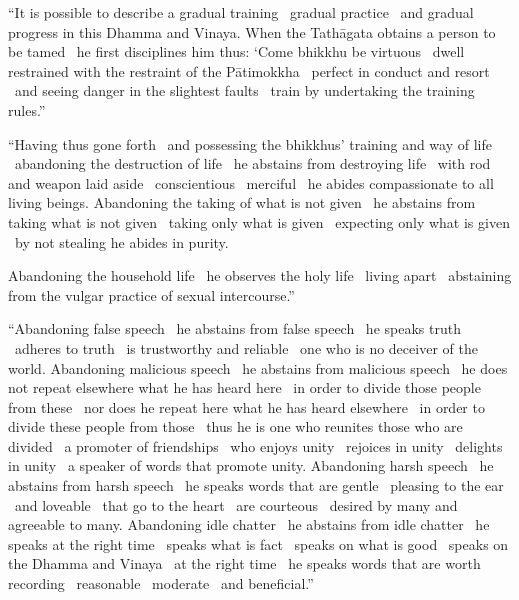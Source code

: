 “It is possible to describe a gradual training \breathmark\ gradual practice \breathmark\ and gradual progress in this Dhamma and Vinaya. When the Tathāgata obtains a person to be tamed \breathmark\ he first disciplines him thus: ‘Come bhikkhu be virtuous \breathmark\ dwell restrained with the restraint of the Pātimokkha \breathmark\ perfect in conduct and resort \breathmark\ and seeing danger in the slightest faults \breathmark\ train by undertaking the training rules.”

\suttaRef{[MN 107]}

“Having thus gone forth \breathmark\ and possessing the bhikkhus’ training and way of life \breathmark\ abandoning the destruction of life \breathmark\ he abstains from destroying life \breathmark\ with rod and weapon laid aside \breathmark\ conscientious \breathmark\ merciful \breathmark\ he abides compassionate to all living beings. Abandoning the taking of what is not given \breathmark\ he abstains from taking what is not given \breathmark\ taking only what is given \breathmark\ expecting only what is given \breathmark\ by not stealing he abides in purity.

Abandoning the household life \breathmark\ he observes the holy life \breathmark\ living apart \breathmark\ abstaining from the vulgar practice of sexual intercourse.”

“Abandoning false speech \breathmark\ he abstains from false speech \breathmark\ he speaks truth \breathmark\ adheres to truth \breathmark\ is trustworthy and reliable \breathmark\ one who is no deceiver of the world. Abandoning malicious speech \breathmark\ he abstains from malicious speech \breathmark\ he does not repeat elsewhere what he has heard here \breathmark\ in order to divide those people
from these \breathmark\ nor does he repeat here what he has heard elsewhere \breathmark\ in order to divide these people from those \breathmark\ thus he is one who reunites those who are divided \breathmark\ a promoter of friendships \breathmark\ who enjoys unity \breathmark\ rejoices in unity \breathmark\ delights in unity \breathmark\ a speaker of words that promote unity. Abandoning harsh speech \breathmark\ he abstains from harsh speech \breathmark\ he speaks words that are gentle \breathmark\ pleasing to the ear \breathmark\ and loveable \breathmark\ that go to the heart \breathmark\ are courteous \breathmark\ desired by many and agreeable to many. Abandoning idle chatter \breathmark\ he abstains from idle chatter \breathmark\ he speaks at the right time \breathmark\ speaks what is fact \breathmark\ speaks on what is good \breathmark\ speaks on the Dhamma and Vinaya \breathmark\ at the right time \breathmark\ he speaks words that are worth recording \breathmark\ reasonable \breathmark\ moderate \breathmark\ and beneficial.”

